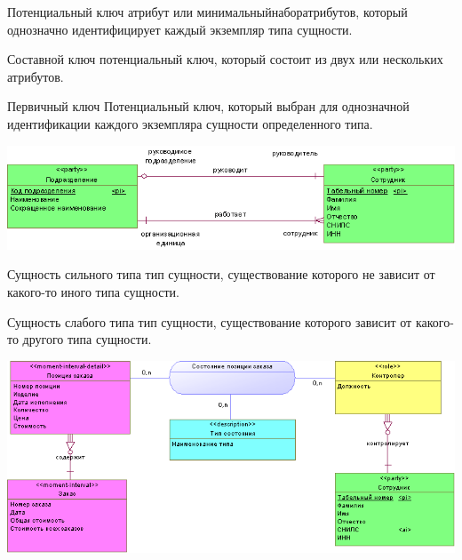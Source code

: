 \documentclass{beamer}
\begin{document}
\begin{frame}
\begin{block}{Потенциальный ключ}
атрибут или минимальныйнаборатрибутов, который однозначно идентифицирует каждый экземпляр типа сущности.
\end{block}
\begin{block}{Составной ключ}
потенциальный ключ, который состоит из двух или нескольких атрибутов.
\end{block}
\begin{block}{Первичный ключ}
Потенциальный ключ, который выбран для однозначной идентификации каждого экземпляра сущности определенного типа.
\end{block}
\begin{center}
\includegraphics[scale=0.5]{images/keys.png}
\end{center}
\end{frame}

\begin{frame}
\begin{block}{Сущность сильного типа}
тип сущности, существование которого не зависит от какого-то иного типа сущности.
\end{block}
\begin{block}{Сущность слабого типа}
тип сущности, существование которого зависит от какого-то другого типа сущности.
\end{block}
\begin{center}
\includegraphics[scale=0.5]{images/depend.png}
\end{center}
\end{frame}
\end{document}
